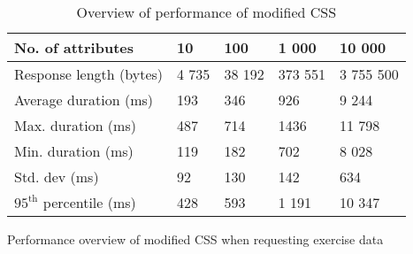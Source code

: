 \begin{table}[H]
\begin{subtable}{1.0\textwidth}
\centering
\begin{tabular}{lllll}
\textbf{No. of attributes} & \multicolumn{1}{l}{\textbf{10}} & \multicolumn{1}{l}{\textbf{100}} & \multicolumn{1}{l}{\textbf{1 000}} & \multicolumn{1}{l}{\textbf{10 000}} \\ \hline
Response length (bytes)    & 4 735                           & 38 192                           & 373 551                            & 3 755 500                           \\
Average duration (ms)      & 193                          & 346                           & 926                             & 9 244                            \\
Max. duration (ms)         & 487                             & 714                              & 1436                               & 11 798                              \\
Min. duration (ms)         & 119                             & 182                              & 702                                & 8 028                               \\
Std. dev (ms)              & 92                           & 130                              & 142                             & 634                              \\
$95^{\text{th}}$ percentile (ms)       & 428                           & 593                            & 1 191                           & 10 347                          
\end{tabular}
\caption{Performance overview of modified \acrshort{CSS} when requesting exercise data}
\label{table:results-modified-xml}
\end{subtable}

\caption{Overview of performance of modified \acrshort{CSS}}
\label{table:results-exp1-modified}

\end{table}